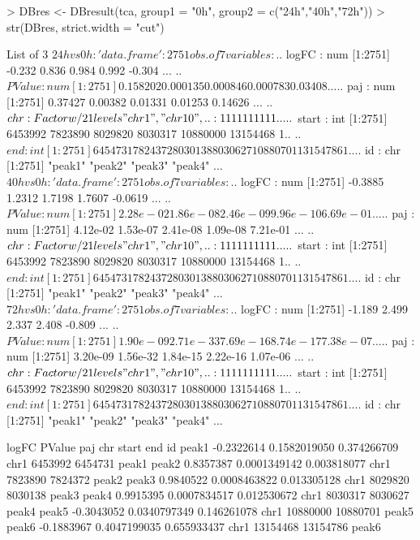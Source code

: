 \documentclass[a4paper]{article}
\begin{document}
\begin{Schunk}
\begin{Sinput}
> DBres <- DBresult(tca, group1 = "0h", group2 = c("24h","40h","72h"))
> str(DBres, strict.width =  "cut")
\end{Sinput}
\begin{Soutput}
List of 3
 $ 24hvs0h:'data.frame':	2751 obs. of  7 variables:
  ..$ logFC : num [1:2751] -0.232 0.836 0.984 0.992 -0.304 ...
  ..$ PValue: num [1:2751] 0.158202 0.000135 0.000846 0.000783 0.03408 ...
  ..$ paj   : num [1:2751] 0.37427 0.00382 0.01331 0.01253 0.14626 ...
  ..$ chr   : Factor w/ 21 levels "chr1","chr10",..: 1 1 1 1 1 1 1 1 1 1 ...
  ..$ start : int [1:2751] 6453992 7823890 8029820 8030317 10880000 13154468 1..
  ..$ end   : int [1:2751] 6454731 7824372 8030138 8030627 10880701 13154786 1..
  ..$ id    : chr [1:2751] "peak1" "peak2" "peak3" "peak4" ...
 $ 40hvs0h:'data.frame':	2751 obs. of  7 variables:
  ..$ logFC : num [1:2751] -0.3885 1.2312 1.7198 1.7607 -0.0619 ...
  ..$ PValue: num [1:2751] 2.28e-02 1.86e-08 2.46e-09 9.96e-10 6.69e-01 ...
  ..$ paj   : num [1:2751] 4.12e-02 1.53e-07 2.41e-08 1.09e-08 7.21e-01 ...
  ..$ chr   : Factor w/ 21 levels "chr1","chr10",..: 1 1 1 1 1 1 1 1 1 1 ...
  ..$ start : int [1:2751] 6453992 7823890 8029820 8030317 10880000 13154468 1..
  ..$ end   : int [1:2751] 6454731 7824372 8030138 8030627 10880701 13154786 1..
  ..$ id    : chr [1:2751] "peak1" "peak2" "peak3" "peak4" ...
 $ 72hvs0h:'data.frame':	2751 obs. of  7 variables:
  ..$ logFC : num [1:2751] -1.189 2.499 2.337 2.408 -0.809 ...
  ..$ PValue: num [1:2751] 1.90e-09 2.71e-33 7.69e-16 8.74e-17 7.38e-07 ...
  ..$ paj   : num [1:2751] 3.20e-09 1.56e-32 1.84e-15 2.22e-16 1.07e-06 ...
  ..$ chr   : Factor w/ 21 levels "chr1","chr10",..: 1 1 1 1 1 1 1 1 1 1 ...
  ..$ start : int [1:2751] 6453992 7823890 8029820 8030317 10880000 13154468 1..
  ..$ end   : int [1:2751] 6454731 7824372 8030138 8030627 10880701 13154786 1..
  ..$ id    : chr [1:2751] "peak1" "peak2" "peak3" "peak4" ...
\end{Soutput}
\begin{Soutput}
           logFC       PValue         paj  chr    start      end    id
peak1 -0.2322614 0.1582019050 0.374266709 chr1  6453992  6454731 peak1
peak2  0.8357387 0.0001349142 0.003818077 chr1  7823890  7824372 peak2
peak3  0.9840522 0.0008463822 0.013305128 chr1  8029820  8030138 peak3
peak4  0.9915395 0.0007834517 0.012530672 chr1  8030317  8030627 peak4
peak5 -0.3043052 0.0340797349 0.146261078 chr1 10880000 10880701 peak5
peak6 -0.1883967 0.4047199035 0.655933437 chr1 13154468 13154786 peak6
\end{Soutput}
\end{Schunk}
\end{document}
